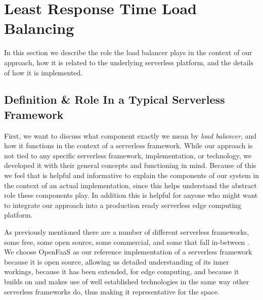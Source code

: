 \section{Least Response Time Load Balancing}
In this section we describe the role the load balancer plays in the context of our approach, how it is related to the underlying serverless platform, and the details of how it is implemented.

\subsection{ Definition \& Role In a Typical Serverless Framework}
First, we want to discuss what component exactly we mean by \textit{load balancer}, and how it functions in the context of a serverless framework. While our approach is not tied to any specific serverless framework, implementation, or technology, we developed it with their general concepts and functioning in mind. Because of this we feel that is helpful and informative to explain the components of our system in the context of an actual implementation, since this helps understand the abstract role these components play. In addition this is helpful for anyone who might want to integrate our approach into a production ready serverless edge computing platform.

As previously mentioned there are a number of different serverless frameworks, some free, some open source, some commercial, and some that fall in-between\cite{aws-lambda}\cite{azure-functions} \cite{openfaas-gateway}\cite{kubeless}\cite{openwhisk}.
We choose OpenFaaS\cite{openfaas}
as our reference implementation of a serverless framework because it is open source, allowing us detailed understanding of its inner workings, because it has been extended, for edge computing, and because it builds on and makes use of well established technologies in the same way other serverless frameworks do\cite{kubeless}\cite{openwhisk}, thus making it representative for the space.


